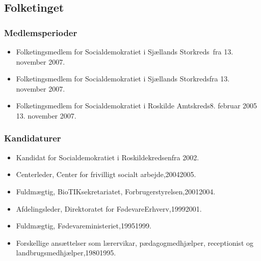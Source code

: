 \documentclass[11pt, a4paper]{awesome-cv}
\begin{document}
\begin{cvletter}
\subsection*{Folketinget}
\subsubsection*{Medlemsperioder}
\begin{itemize}
\item Folketingsmedlem for Socialdemokratiet i Sjællands Storkreds fra 13. november 2007.
\item Folketingsmedlem for Socialdemokratiet i Sjællands Storkredsfra 13. november 2007.
\item Folketingsmedlem for Socialdemokratiet i Roskilde Amtskreds8. februar 2005  13. november 2007.
\end{itemize}
\subsubsection*{Kandidaturer}
\begin{itemize}
\item Kandidat for Socialdemokratiet i Roskildekredsenfra 2002.
\end{itemize}
\begin{itemize}
\item Centerleder, Center for frivilligt socialt arbejde,20042005.
\item Fuldmægtig, BioTIKsekretariatet, Forbrugerstyrelsen,20012004.
\item Afdelingsleder, Direktoratet for FødevareErhverv,19992001.
\item Fuldmægtig, Fødevareministeriet,19951999.
\item Forskellige ansættelser som lærervikar, pædagogmedhjælper, receptionist og landbrugsmedhjælper,19801995.
\end{itemize}
\end{cvletter}
\end{document}
